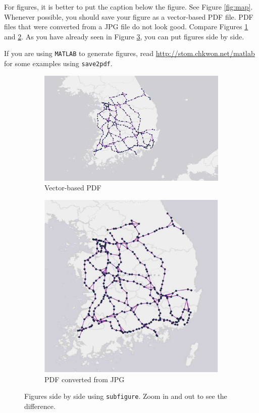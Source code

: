 \documentclass[letterpaper, 11pt]{article}
\begin{document}
For figures, it is better to put the caption below the figure. See Figure \ref{fig:map}. Whenever possible, you should save your figure as a vector-based PDF file. PDF files that were converted from a JPG file do not look good. Compare Figures \ref{fig:map-pdf} and \ref{fig:map-jpg}. As you have already seen in Figure \ref{fig:side-by-side}, you can put figures side by side.

If you are using \texttt{MATLAB} to generate figures, read \url{http://stom.chkwon.net/matlab} for some examples using \texttt{save2pdf}.



\begin{figure} \centering
\begin{subfigure}[b]{0.4\textwidth}
\includegraphics[width=\textwidth]{map}
\caption{Vector-based PDF}
\label{fig:map-pdf}
\end{subfigure}
%
\begin{subfigure}[b]{0.4\textwidth}
\includegraphics[width=\textwidth]{map-jpg}
\caption{PDF converted from JPG}
\label{fig:map-jpg}
\end{subfigure}
\caption{Figures side by side using \texttt{subfigure}. Zoom in and out to see the difference.}
\label{fig:side-by-side}
\end{figure}
\end{document}
